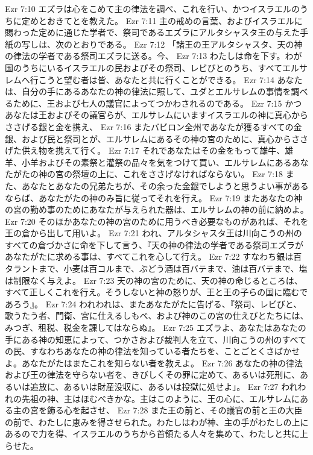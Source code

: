 Ezr 7:10  エズラは心をこめて主の律法を調べ、これを行い、かつイスラエルのうちに定めとおきてとを教えた。
Ezr 7:11  主の戒めの言葉、およびイスラエルに賜わった定めに通じた学者で、祭司であるエズラにアルタシャスタ王の与えた手紙の写しは、次のとおりである。
Ezr 7:12  「諸王の王アルタシャスタ、天の神の律法の学者である祭司エズラに送る。今、
Ezr 7:13  わたしは命を下す。わが国のうちにいるイスラエルの民およびその祭司、レビびとのうち、すべてエルサレムへ行こうと望む者は皆、あなたと共に行くことができる。
Ezr 7:14  あなたは、自分の手にあるあなたの神の律法に照して、ユダとエルサレムの事情を調べるために、王および七人の議官によってつかわされるのである。
Ezr 7:15  かつあなたは王およびその議官らが、エルサレムにいますイスラエルの神に真心からささげる銀と金を携え、
Ezr 7:16  またバビロン全州であなたが獲るすべての金銀、および民と祭司とが、エルサレムにあるその神の宮のために、真心からささげた供え物を携えて行く。
Ezr 7:17  それであなたはその金をもって雄牛、雄羊、小羊およびその素祭と灌祭の品々を気をつけて買い、エルサレムにあるあなたがたの神の宮の祭壇の上に、これをささげなければならない。
Ezr 7:18  また、あなたとあなたの兄弟たちが、その余った金銀でしようと思うよい事があるならば、あなたがたの神のみ旨に従ってそれを行え。
Ezr 7:19  またあなたの神の宮の勤め事のためにあなたが与えられた器は、エルサレムの神の前に納めよ。
Ezr 7:20  そのほかあなたの神の宮のために用うべき必要なものがあれば、それを王の倉から出して用いよ。
Ezr 7:21  われ、アルタシャスタ王は川向こうの州のすべての倉づかさに命を下して言う、『天の神の律法の学者である祭司エズラがあなたがたに求める事は、すべてこれを心して行え。
Ezr 7:22  すなわち銀は百タラントまで、小麦は百コルまで、ぶどう酒は百バテまで、油は百バテまで、塩は制限なく与えよ。
Ezr 7:23  天の神の宮のために、天の神の命じるところは、すべて正しくこれを行え。そうしないと神の怒りが、王と王の子らの国に臨むであろう』。
Ezr 7:24  われわれは、またあなたがたに告げる、『祭司、レビびと、歌うたう者、門衛、宮に仕えるしもべ、および神のこの宮の仕えびとたちには、みつぎ、租税、税金を課してはならぬ』。
Ezr 7:25  エズラよ、あなたはあなたの手にある神の知恵によって、つかさおよび裁判人を立て、川向こうの州のすべての民、すなわちあなたの神の律法を知っている者たちを、ことごとくさばかせよ。あなたがたはまたこれを知らない者を教えよ。
Ezr 7:26  あなたの神の律法および王の律法を守らない者を、きびしくその罪に定めて、あるいは死刑に、あるいは追放に、あるいは財産没収に、あるいは投獄に処せよ」。
Ezr 7:27  われわれの先祖の神、主はほむべきかな。主はこのように、王の心に、エルサレムにある主の宮を飾る心を起させ、
Ezr 7:28  また王の前と、その議官の前と王の大臣の前で、わたしに恵みを得させられた。わたしはわが神、主の手がわたしの上にあるので力を得、イスラエルのうちから首領たる人々を集めて、わたしと共に上らせた。
